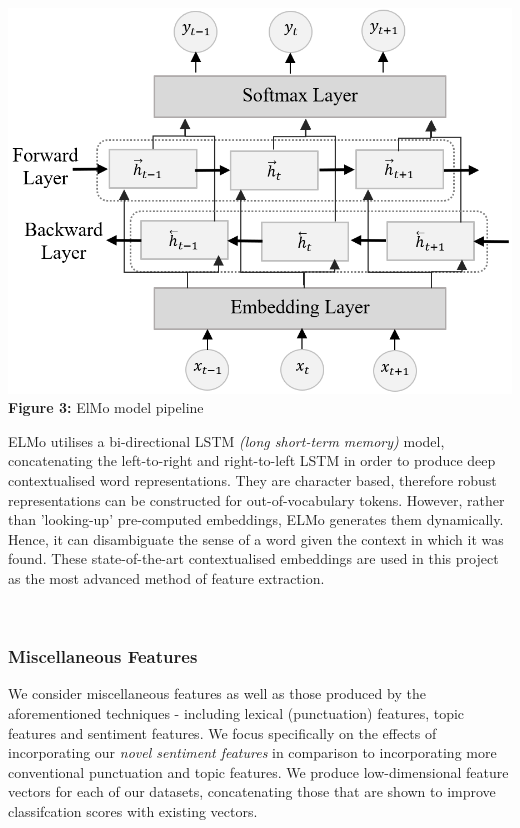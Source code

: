\documentclass[12pt,a4paper]{article}
\begin{document}
\begin{minipage}{0.3\textwidth}
	 	\begin{center}
		\hspace{-1.5cm}\includegraphics[width=1.2\textwidth]{Images/elmo_diagram2.png}\\
		\hspace{-1cm}\textbf{Figure 3:} ElMo model pipeline\\
		\label{ElMo Model}
	\end{center}
\end{minipage} \hfill
\begin{minipage}{0.66\textwidth}
	  ELMo utilises a bi-directional LSTM \textit{(long short-term memory)} model, concatenating the left-to-right and right-to-left LSTM in order to produce deep contextualised word representations. They are character based, therefore robust representations can be constructed for out-of-vocabulary tokens. However, rather than 'looking-up' pre-computed embeddings, ELMo generates them dynamically. Hence, it can disambiguate the sense of a word given the context in which it was found. These state-of-the-art contextualised embeddings are used in this project as the most advanced method of feature extraction.
\end{minipage}\\

\subsubsection{Miscellaneous Features}
We consider miscellaneous features as well as those produced by the aforementioned techniques - including lexical (punctuation) features, topic features and sentiment features. We focus specifically on the effects of incorporating our \textit{novel sentiment features} in comparison to incorporating more conventional punctuation and topic features. We produce low-dimensional feature vectors for each of our datasets, concatenating those that are shown to improve classifcation scores with existing vectors.\\\vspace{-5pt}
\end{document}
